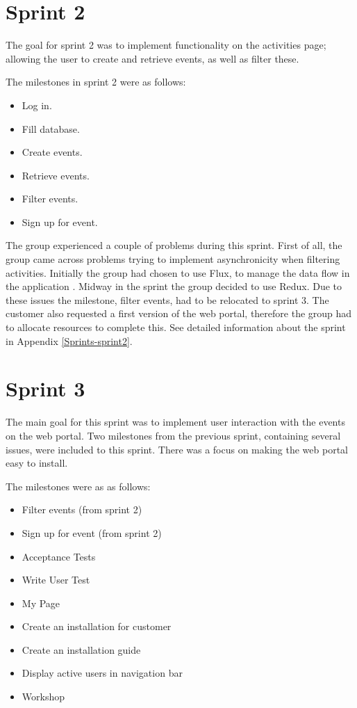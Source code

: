 \section{Sprint 2} 
\label{sprint2}
The goal for sprint 2 was to implement functionality on the activities page; allowing the user to create and retrieve events, as well as filter these. 

The milestones in sprint 2 were as follows:
\begin{itemize}[noitemsep]
  \item Log in.
  \item Fill database.
  \item Create events.
  \item Retrieve events.
  \item Filter events.
  \item Sign up for event.
\end{itemize}

The group experienced a couple of problems during this sprint. First of all, the group came across problems trying to implement asynchronicity when filtering activities. Initially the group had chosen to use Flux, to manage the data flow in the application \cite{flux}. Midway in the sprint the group decided to use Redux. Due to these issues the milestone, filter events, had to be relocated to sprint 3. The customer also requested a first version of the web portal, therefore the group had to allocate resources to complete this. See detailed information about the sprint in Appendix \ref{Sprints-sprint2}.


\section{Sprint 3}
\label{sprint3}
The main goal for this sprint was to implement user interaction with the events on the web portal. Two milestones from the previous sprint, containing several issues, were included to this sprint. There was a focus on making the web portal easy to install. 

The milestones were as as follows: 
\begin{itemize}[noitemsep]
    \item Filter events (from sprint 2)
    \item Sign up for event (from sprint 2)
    \item Acceptance Tests
    \item Write User Test
    \item My Page
    \item Create an installation for customer
    \item Create an installation guide
    \item Display active users in navigation bar
    \item Workshop
\end{itemize}

